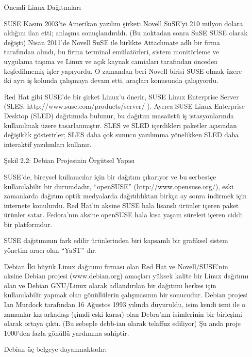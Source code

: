 \begin{section}{Önemli Linux Dağıtımları}
\begin{subsection}{SUSE}
Kasım 2003'te Amerikan yazılım şirketi Novell SuSE'yi 210 milyon dolara aldığını ilan etti; anlaşma sonuçlandırıldı. (Bu noktadan sonra SuSE SUSE olarak değişti) Nisan 2011'de Novell SuSE ile birlikte Attachmate adlı bir firma tarafından alındı, bu firma terminal emülatörleri, sistem monitörleme ve uygulama taşıma ve Linux ve açık kaynak camiaları tarafından önceden keşfedilmemiş işler yapıyordu. O zamandan beri Novell birisi SUSE olmak üzere iki ayrı iş kolunda çalışmaya devam etti. araçları konusunda çalışıyordu.

Red Hat gibi SUSE'de bir şirket Linux'u önerir, SUSE Linux Enterprise Server (SLES, http://www.suse.com/products/server/ ). Ayrıca SUSE Linux Enterprise Desktop (SLED) dağıtımıda bulunur, bu dağıtım masaüstü iş istasyonlarında kullanılmak üzere tasarlanmıştır. SLES ve SLED içerdikleri paketler açısından değişiklik gösterirler; SLES daha çok sunucu yazılımına yönelikken SLED daha interaktif yazılımları kullanır.

Şekil 2.2: Debian Projesinin Örgütsel Yapısı

SUSE'de, bireysel kullanıcılar için bir dağıtım çıkarıyor ve bu serbestçe kullanılabilir bir durumdadır, “openSUSE” (http://www.opensuse.org/), eski zamanlarda dağıtım optik medyalarda dağıtıldıktan birkça ay sonra indirmek için internete konulurdu. Red Hat'in aksine SUSE hala lisanslı ürünler içeren paket ürünler satar. Fedora'nın aksine openSUSE hala kısa yaşam süreleri içeren ciddi bir platformdur.

SUSE dağıtımının fark edilir ürünlerinden biri kapsamlı bir grafiksel sistem yönetim aracı olan “YaST” dır.

\end{subsection}
\begin{subsection}{Debian}
\label{sec:bolum244}
İki büyük Linux dağıtımı firması olan Red Hat ve Novell/SUSE'nin aksine Debian projesi (www.debian.org) amaçları yüksek kalite bir Linux dağıtımı olan ve Debian GNU/Linux olarak adlandırılan bir dağıtımı herkes için kullanılabilir yapmak olan gönüllülerin çalışmasının bir sonucudur. Debian projesi Ian Murdock tarafından 16 Ağustos 1993 yılında duyuruldu, isim kendi ismi ile o zamanlar kız arkadaşı (şimdi eski karısı) olan Debra'nın isimlerinin bir birleşimi olarak ortaya çıktı. (Bu sebeple debb-ian olarak telaffuz ediliyor) Şu anda proje 1000'den fazla gönüllü yardımına sahiptir.

Debian üç belgeye dayanmaktadır:


\end{subsection}
\end{section}
